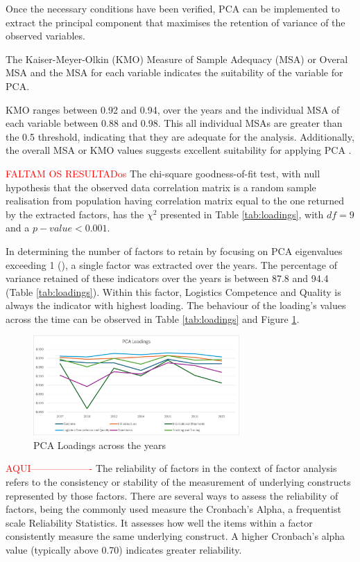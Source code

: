 \documentclass[sigconf]{acmart}
\begin{document}
Once the necessary conditions have been verified, PCA can be implemented to extract the principal component that maximises the retention of variance of the observed variables.

The Kaiser-Meyer-Olkin (KMO) Measure of Sample Adequacy (MSA) or Overal MSA and the MSA for each variable indicates the suitability of the variable for PCA. 

KMO ranges between 0.92 and 0.94, over the years
and the individual MSA of each variable between 0.88 and 0.98.
This all individual MSAs are greater than the 0.5 threshold, indicating that they are adequate for the analysis. Additionally, the overall MSA or KMO  values suggests excellent suitability for applying PCA \cite{maroco2018analise}. 


\textcolor{red}{FALTAM OS RESULTADos}
The chi-square goodness-of-fit test, with null hypothesis that the observed data correlation matrix  is a random sample realisation from population having correlation matrix equal to the one returned by the extracted factors, has the $\chi^2$ presented in Table \ref{tab:loadings}, with $df=9$ and a $p-value <0.001$.


In determining the number of factors to retain by focusing on PCA eigenvalues  exceeding 1 (\cite{carroll1978effect}), a single factor was extracted  over the years. The percentage of variance retained of these indicators over the years is between 87.8 and 94.4 (Table \ref{tab:loadings}). Within this factor,  Logistics Competence and Quality is always the indicator with highest loading. The behaviour of the loading's values across the time can be observed in Table \ref{tab:loadings} and Figure \ref{fig:PCAl}.

\begin{figure}
    \centering
    \includegraphics[width=0.7\textwidth]{Loadings.png}
    \caption{PCA Loadings across the years}
    \label{fig:PCAl}
\end{figure}

\textcolor{red}{AQUI-------------------}
The reliability of factors in the context of factor analysis refers to the consistency or stability of the measurement of underlying constructs represented by those factors. There are several ways to assess the reliability of factors, being the commonly used measure the Cronbach's Alpha, a frequentist scale Reliability Statistics. It assesses how well the items within a factor consistently measure the same underlying construct. A higher Cronbach's alpha value (typically above 0.70) indicates greater reliability.
%
\end{document}
